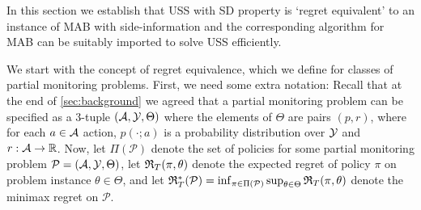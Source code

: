 \newcommand{\one}[1]{\mathbb{I}_{\{#1\}}}
\newcommand{\Pside}{\P_{\mathrm{side}}\xspace}
\newcommand{\PSAP}{\P_{\mathrm{SAP}}\xspace}
\newcommand{\PUSS}{\P_{\mathrm{USS}}\xspace}
\renewcommand{\P}{\mathcal{P}}

In this section we establish that USS with SD property is `regret equivalent' to an instance of MAB with side-information and the corresponding algorithm for MAB can be suitably imported to solve USS efficiently.   

We start with the concept of regret equivalence, which we define for classes of partial monitoring problems.
First, we need some extra notation: Recall that at the end of \cref{sec:background} we agreed that 
a partial monitoring problem can be specified as a 3-tuple $(\mathcal{A},\mathcal{Y},\Theta)$ where the elements of $\Theta$ are pairs $(p,r)$,
where for each $a\in \mathcal{A}$ action, $p(\cdot;a)$ is a probability distribution over $\mathcal{Y}$ and $r: \mathcal{A} \to \mathbb{R}$.
Now, let $\Pi(\P)$ denote the set of policies for some partial monitoring problem $\P = (\A,\Y,\Theta)$,
let $\mathfrak{R}_T(\pi,\theta)$ denote the expected regret of policy $\pi$ on problem instance $\theta\in \Theta$,
and let $\Regret_T^*(\P) = \inf_{\pi\in \Pi(\P)}\sup_{\theta\in \Theta} \Regret_T(\pi,\theta)$ denote the minimax regret on $\P$.

